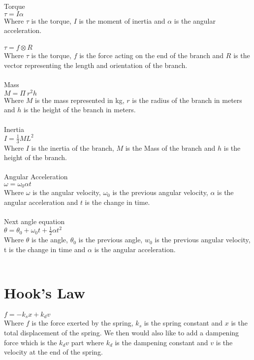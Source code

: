 Torque\\
$ \tau = I\alpha $ \\
Where $\tau$ is the torque, $I$ is the moment of inertia and $\alpha$ is the angular acceleration.\\
\\
$ \tau = f \otimes R $ \\
Where $\tau$ is the torque, $f$ is the force acting on the end of the branch and $R$ is the vector representing the length and orientation of the branch. \\
\\
Mass \\
$ M = \Pi~ r ^ 2 h $  \\
Where $M$ is the mass represented in kg, $r$ is the radius of the branch in meters and $h$ is the height of the branch in meters. \\
\\
Inertia\\
$ I = \frac{1}{3} M L ^ 2 $ \\ 
Where $I$ is the inertia of the branch, $M$ is the Mass of the branch and $h$ is the height of the branch. \\
\\
Angular Acceleration\\
$ \omega = \omega _0 \alpha t $ \\
Where $\omega$ is the angular velocity, $\omega _0 $ is the previous angular velocity, $\alpha$ is the angular acceleration and $t$ is the change in time. \\
\\
Next angle equation\\
$ \theta = \theta _0 + \omega _0 t + \frac{1}{2} \alpha t ^2 $ \\
Where $\theta$ is the angle, $\theta _0$ is the previous angle, $w _0$ is the previous angular velocity, t is the change in time and $\alpha$ is the angular acceleration. \\
\\

\section{Hook's Law}

$ f = -k _s x + k _d v$\\
Where $f$ is the force exerted by the spring, $k _s$ is the spring constant and $x$ is the total displacement of the spring. We then would also like to add a dampening force which is the $k _d v$ part where $k _d$ is the dampening constant and $v$ is the velocity at the end of the spring.\\
